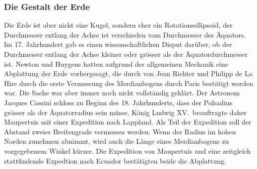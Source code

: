 \subsubsection{Die Gestalt der Erde}
Die Erde ist aber nicht eine Kugel, sondern eher ein Rotationsellipsoid,
der Durchmesser entlang der Achse ist verschieden vom Durchmesser des 
Äquators.
Im 17. Jahrhundert gab es einen wissenschaftlichen Disput darüber,
ob der Durchmesser entlang der Achse kleiner oder grösser als der
Äquatordurchmesser ist.
Newton und Huygens hatten aufgrund der allgemeinen Mechanik eine Abplattung
der Erde vorhergesagt, die durch von Jean Richter und Philipp de La Hire
durch die erste Vermessung des Merdianbogens durch Paris bestätigt 
worden war.
Die Sache war aber immer noch nicht vollständig geklärt.
Der Astronom Jacques Cassini schloss zu Beginn des 18. Jahrhunderts,
dass der Polradius grösser als der Äquatorradius sein müsse.
König Ludwig XV.~beauftragte daher Maupertuis mit einer Expedition
nach Lappland.
Als Teil der Expedition soll der Abstand zweier Breitengrade
vermessen werden.
Wenn der Radius im hohen Norden zunehmen abnimmt, wird auch die Länge
eines Merdianbogens zu vorgegebenem Winkel kürzer.
Die Expedition von Maupertuis und eine zeitgleich stattfindende Expedtion
nach Ecuador bestätigten beide die Abplattung.





